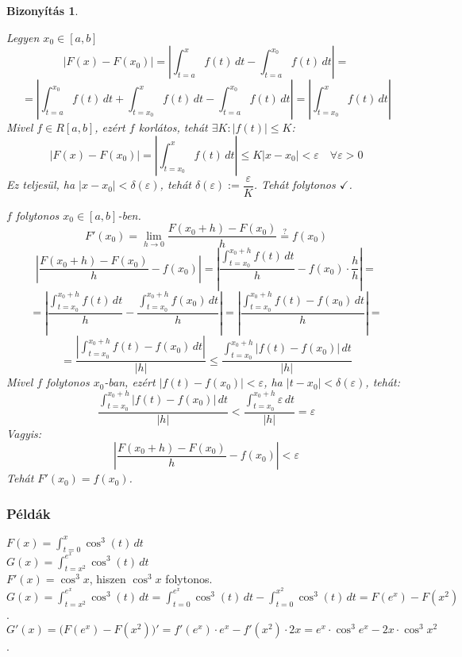 \documentclass[a4paper,12pt,twoside]{book}
\theoremstyle{break}
\newtheorem{biz}{Bizonyítás}[chapter]
\theoremstyle{plain}
\newcommand{\intfv}[3]{\ensuremath{\int^{#2}_{t=#1} #3\, dt}}
\begin{document}
\begin{biz}
  \begin{enumerate*}
  \item Legyen $x_0\in [a,b]$
  \[|F(x)-F(x_0)| = \left|\intfv{a}{x}{f(t)}-\intfv{a}{x_0}{f(t)}\right| = \]
  \[ = \left|\intfv{a}{x_0}{f(t)}+\intfv{x_0}{x}{f(t)}-\intfv{a}{x_0}{f(t)}\right| = \left|\intfv{x_0}{x}{f(t)}\right| \]
  Mivel $f\in R[a,b]$, ezért $f$ korlátos, tehát $\exists K:|f(t)|\leqslant K$:
  \[|F(x)-F(x_0)| = \left|\intfv{x_0}{x}{f(t)}\right| \leqslant K|x-x_0| < \varepsilon \quad \forall\varepsilon>0 \]
  Ez teljesül, ha $|x-x_0|<\delta(\varepsilon)$, tehát $\delta(\varepsilon) := \dfrac{\varepsilon}{K}$. Tehát folytonos $\checkmark$.
  \item $f$ folytonos $x_0\in [a,b]$-ben.
    \[F'(x_0) = \lim_{h\to 0} \frac{F(x_0+h)-F(x_0)}{h} \overset{?}{=} f(x_0)\]
    \[\left|\frac{F(x_0+h)-F(x_0)}{h}-f(x_0)\right|=\left|\frac{\intfv{x_0}{x_0+h}{f(t)}}{h}-f(x_0)\cdot\frac{h}{h}\right| = \]
    \[= \left|\frac{\intfv{x_0}{x_0+h}{f(t)}}{h}-\frac{\intfv{x_0}{x_0+h}{f(x_0)}}{h}\right| = \left|\frac{\intfv{x_0}{x_0+h}{f(t)-f(x_0)}}{h}\right| = \]
    \[ = \frac{\left|\intfv{x_0}{x_0+h}{f(t)-f(x_0)}\right|}{|h|} \leqslant \frac{\intfv{x_0}{x_0+h}{\left|f(t)-f(x_0)\right|}}{|h|}\]
    Mivel $f$ folytonos $x_0$-ban, ezért $|f(t)-f(x_0)|<\varepsilon$, ha $|t-x_0|<\delta(\varepsilon)$, tehát:
    \[\frac{\intfv{x_0}{x_0+h}{\left|f(t)-f(x_0)\right|}}{|h|} < \frac{\intfv{x_0}{x_0+h}{\varepsilon}}{|h|} = \varepsilon\]
    Vagyis:
     \[\left|\frac{F(x_0+h)-F(x_0)}{h}-f(x_0)\right| < \varepsilon\]
    Tehát $F'(x_0) = f(x_0)$.
 \end{enumerate*}
\vspace{-10pt}
\end{biz}

\subsubsection{Példák}

$F(x) = \intfv{0}{x}{\cos^3(t)}$\\
$G(x) = \intfv{x^2}{e^x}{\cos^3(t)}$\\

$F'(x) = \cos^3 x$, hiszen $\cos^3 x$ folytonos.\\
$G(x) = \intfv{x^2}{e^x}{\cos^3(t)} = \intfv{0}{e^x}{\cos^3(t)} - \intfv{0}{x^2}{\cos^3(t)} = F(e^x)-F(x^2)$.\\
$G'(x) = \Big(F(e^x)-F(x^2)\Big)' = f'(e^x)\cdot e^x - f'(x^2)\cdot 2x = e^x\cdot\cos^3 e^x - 2x\cdot \cos^3 x^2$.
\end{document}
